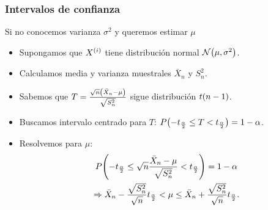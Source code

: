 \documentclass[table]{beamer}
\begin{document}
\begin{frame}
    \frametitle{Intervalos de confianza}
    \begin{block}{Si no conocemos varianza $\sigma^{2}$ y queremos estimar $\mu$}
        \begin{itemize}
            \item Supongamos que $X^{\parens{i}}$ tiene distribución normal $\normal{\mu}{\sigma^{2}}$.
            \item Calculamos media y varianza muestrales $\bar{X}_{n}$ y $S^{2}_{n}$.
            \item Sabemos que $T = \frac{\sqrt{n} \parens{\bar{X}_{n} - \mu}}{\sqrt{S^{2}_{n}}}$ sigue distribución $\tdist{n - 1}$.
            \item Buscamos intervalo centrado para $T$: $\prob{-t_{\frac{\alpha}{2}} \leq T < t_{\frac{\alpha}{2}}} = 1 - \alpha$.
            \item Resolvemos para $\mu$:
                \begin{multline*}
                    \prob{- t_{\frac{\alpha}{2}} \leq \sqrt{n} \frac{\bar{X}_{n} - \mu}{\sqrt{S^{2}_{n}}} < t_{\frac{\alpha}{2}}}
                    = 1 - \alpha
                    \\
                    \Rightarrow
                    \bar{X}_{n} - \frac{\sqrt{S^{2}_{n}}}{\sqrt{n}} t_{\frac{\alpha}{2}} < \mu \leq \bar{X}_{n} + \frac{\sqrt{S^{2}_{n}}}{\sqrt{n}} t_{\frac{\alpha}{2}}
                    .
                \end{multline*}
        \end{itemize}
    \end{block}


\end{frame}
\end{document}
